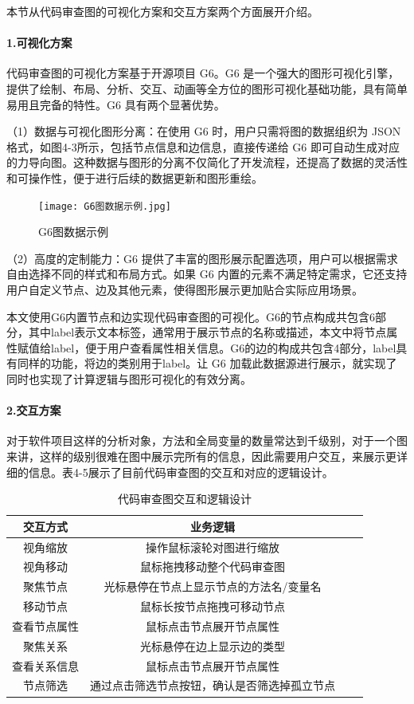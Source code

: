 本节从代码审查图的可视化方案和交互方案两个方面展开介绍。

\paragraph{1.可视化方案}

代码审查图的可视化方案基于开源项目 G6。G6 是一个强大的图形可视化引擎，提供了绘制、布局、分析、交互、动画等全方位的图形可视化基础功能，具有简单易用且完备的特性。G6 具有两个显著优势。

（1）数据与可视化图形分离：在使用 G6 时，用户只需将图的数据组织为 JSON 格式，如图4-3所示，包括节点信息和边信息，直接传递给 G6 即可自动生成对应的力导向图。这种数据与图形的分离不仅简化了开发流程，还提高了数据的灵活性和可操作性，便于进行后续的数据更新和图形重绘。

\begin{figure}[h]
\centering
\texttt{[image: G6图数据示例.jpg]}
\caption{G6图数据示例}
\end{figure}

（2）高度的定制能力：G6 提供了丰富的图形展示配置选项，用户可以根据需求自由选择不同的样式和布局方式。如果 G6 内置的元素不满足特定需求，它还支持用户自定义节点、边及其他元素，使得图形展示更加贴合实际应用场景。

本文使用G6内置节点和边实现代码审查图的可视化。G6的节点构成共包含6部分，其中label表示文本标签，通常用于展示节点的名称或描述，本文中将节点属性赋值给label，便于用户查看属性相关信息。G6的边的构成共包含4部分，label具有同样的功能，将边的类别用于label。让 G6 加载此数据源进行展示，就实现了同时也实现了计算逻辑与图形可视化的有效分离。


\paragraph{2.交互方案}

对于软件项目这样的分析对象，方法和全局变量的数量常达到千级别，对于一个图来讲，这样的级别很难在图中展示完所有的信息，因此需要用户交互，来展示更详细的信息。表4-5展示了目前代码审查图的交互和对应的逻辑设计。


\begin{table}[htbp]
\caption{代码审查图交互和逻辑设计}
\vspace{0.5em}\centering\wuhao
\begin{tabular}{cccc}
\toprule
交互方式 & 业务逻辑 \\
\midrule
视角缩放 & 操作鼠标滚轮对图进行缩放  \\
视角移动 & 鼠标拖拽移动整个代码审查图   \\
聚焦节点 & 光标悬停在节点上显示节点的方法名/变量名  \\
移动节点 & 鼠标长按节点拖拽可移动节点 \\
查看节点属性 & 鼠标点击节点展开节点属性  \\
聚焦关系 & 光标悬停在边上显示边的类型  \\
查看关系信息 & 鼠标点击节点展开节点属性  \\
节点筛选 & 通过点击筛选节点按钮，确认是否筛选掉孤立节点 \\
\bottomrule
\end{tabular}
\end{table}



